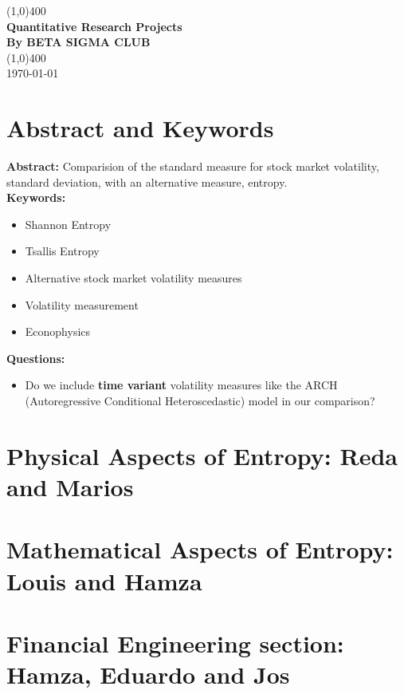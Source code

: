 \documentclass[11pt]{article}
\begin{document}
\begin{titlepage}
\begin{center}
\vspace*{1cm}
\vfill
\line(1,0){400}\\[1mm]
\huge{\textbf{Quantitative Research Projects}}\\[3mm]
\Large{\textbf{By BETA SIGMA CLUB}}\\[1mm]
\line(1,0){400}\\[3mm]
\vfill
\today

\end{center}
\end{titlepage}

\section{Abstract and Keywords}
\textbf{Abstract:} Comparision of the standard measure for stock market volatility, standard deviation, with an alternative measure, entropy. \\

\noindent \textbf{Keywords:}
\begin{itemize}
\item Shannon Entropy
\item Tsallis Entropy
\item Alternative stock market volatility measures
\item Volatility measurement
\item Econophysics
\end{itemize}

\noindent \textbf{Questions:}
\begin{itemize}
\item Do we include \textbf{time variant} volatility measures like the ARCH (Autoregressive Conditional Heteroscedastic) model in our comparison?
\end{itemize}

\section{Physical Aspects of Entropy: Reda and Marios}
\section{Mathematical Aspects of Entropy: Louis and Hamza}
\section{Financial Engineering section: Hamza, Eduardo and Jos}
\end{document}
